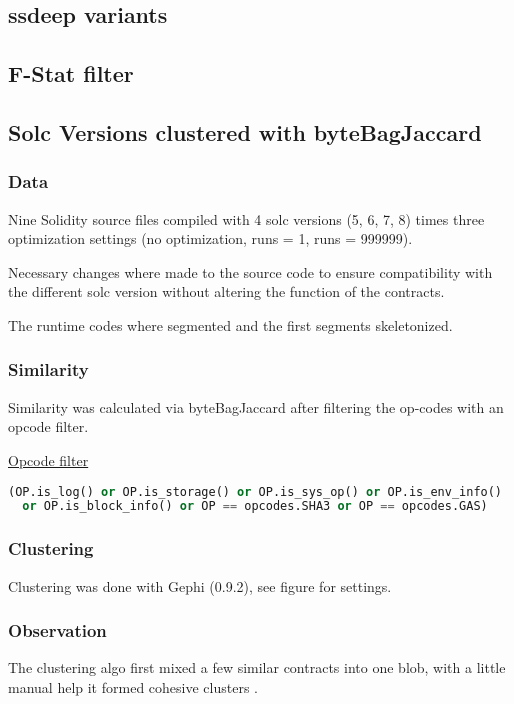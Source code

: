 \documentclass[../main.tex]{subfiles}
\begin{document}

\subsection{ssdeep variants}

\subsection{F-Stat filter}


\subsection{Solc Versions clustered with byteBagJaccard}

\subsubsection{Data}

Nine Solidity source files compiled with 4 solc versions (5, 6, 7, 8) times three optimization
settings (no optimization, runs = 1, runs = 999999).

Necessary changes where made to the source code to ensure compatibility with the different solc
version without altering the function of the contracts.

The runtime codes where segmented and the first segments skeletonized.

\subsubsection{Similarity}
Similarity was calculated via byteBagJaccard after filtering the op-codes with an opcode filter.

\underline{Opcode filter}
\begin{lstlisting}[style=mystyle,language=Python]
(OP.is_log() or OP.is_storage() or OP.is_sys_op() or OP.is_env_info()
  or OP.is_block_info() or OP == opcodes.SHA3 or OP == opcodes.GAS)
\end{lstlisting}

\subsubsection{Clustering}
Clustering was done with Gephi (0.9.2), see figure for settings.

\subsubsection{Observation}
The clustering algo first mixed a few similar contracts into one blob, with a little manual help
it formed cohesive clusters .
\end{document}
